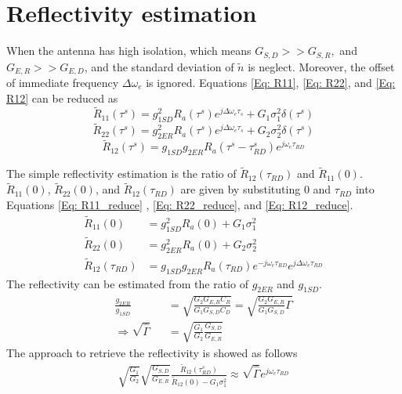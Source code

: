 \documentclass[draftcls]{IEEEtran}
\begin{document}
\section{Reflectivity estimation}
When the antenna has high isolation, which means $G_{S,D} >> G_{S,R}, $ and $G_{E,R} >> G_{E,D}$, and the standard deviation of $\tilde{n}$ is neglect. Moreover, the offset of immediate frequency $\Delta\omega_e$ is ignored. Equations \ref{Eq: R11}, \ref{Eq: R22}, and \ref{Eq: R12} can be reduced as
\begin{equation}
	\tilde{R}_{11}(\tau^s) = g^2_{1SD} R_a(\tau^s)e^{j\Delta\omega_e\tau_s}+
G_1\sigma^2_1 \delta(\tau^s)                                      
\label{Eq: R11_reduce}
\end{equation}
\begin{equation}
	\tilde{R}_{22}(\tau^s) = g^2_{2ER} R_a(\tau^s)e^{j\Delta\omega_e\tau_s}+
G_2\sigma^2_2 \delta(\tau^s)                                      
\label{Eq: R22_reduce}
\end{equation}
\begin{equation}
	\tilde{R}_{12}(\tau^s) = g_{1SD} g_{2ER} R_a(\tau^s-\tau^s_{RD})e^{j\omega_e \tau_{RD}}             
\label{Eq: R12_reduce}
\end{equation}

The simple reflectivity estimation is the ratio of $\tilde{R}_{12}(\tau_{RD})$ and $\tilde{R}_{11}(0)$. $\tilde{R}_{11}(0)$, $\tilde{R}_{22}(0)$, and $\tilde{R}_{12}(\tau_{RD})$ are given by substituting $0$ and $\tau_{RD}$ into Equations \ref{Eq: R11_reduce} , \ref{Eq: R22_reduce}, and \ref{Eq: R12_reduce}.
\begin{align}
	\tilde{R}_{11}(0) &= g^2_{1SD} R_a(0)+G_1\sigma^2_1\\ 
    \tilde{R}_{22}(0) &= g^2_{2ER} R_a(0)+G_2\sigma^2_2\\ 
    \tilde{R}_{12}(\tau_{RD}) &= g_{1SD}  g_{2ER}R_a(\tau_{RD})e^{-j\omega_e \tau_{RD}}e^{j\Delta\omega_e\tau_{RD}}
\label{Eq: R11_reduce}
\end{align}The reflectivity can be estimated from the ratio of $g_{2ER}$ and $g_{1SD}$. 
\begin{eqnarray}
	\frac{g_{2ER}}{g_{1SD}} &&= \sqrt{\frac{G_2 G_{E,R} C_R}{G_1 G_{S,D} C_D}}  = \sqrt{ \frac{G_2 G_{E,R}}{G_1 G_{S,D}} \Gamma}  \nonumber \\
    \Rightarrow \sqrt{\hat{\Gamma}} &&= \sqrt{\frac{G_1}{G_2}\frac{G_{S,D}}{G_{E,R}}}
\end{eqnarray}
The approach to retrieve the reflectivity is showed as follows
\begin{eqnarray}
	\sqrt{\frac{G_1}{G_2}}\sqrt{\frac{G_{S,D}}{G_{E,R}}} \frac{\tilde{R}_{12}(\tau^s_{RD})}{\tilde{R}_{12}(0)-G_1\sigma_1^2}\approx\sqrt{\hat{\Gamma}}e^{j\omega_e \tau_{RD}}   
    \label{Eq: Gamma_estimation_approx}
\end{eqnarray}
\end{document}
